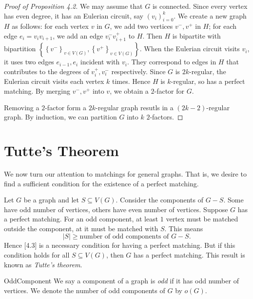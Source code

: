 \documentclass[co342]{subfiles}
\begin{document}
    \begin{proof}[Proof of Proposition 4.2]
        We may assume that $G$ is connected. Since every vertex has even degree, it has an Eulerian circuit, say $\left( v_{i} \right)^{k}_{i=0}$. We create a new graph $H$ as follows: for each vertex $v$ in $G$, we add two vertices $v^-, v^+$ in $H$; for each edge $e_i=v_iv_{i+1}$, we add an edge $v_i^-v_{i+1}^+$ to $H$. Then $H$ is bipartite with bipartition $\left\lbrace \left\lbrace v^- \right\rbrace^{}_{v\in V\left( G \right)}, \left\lbrace v^+ \right\rbrace^{}_{v\in V\left( G \right)} \right\rbrace$. When the Eulerian circuit visits $v_i$, it uses two edges $e_{i-1},e_i$ incident with $v_i$. They correspond to edges in $H$ that contributes to the degrees of $v_i^+, v_i^-$ respectively. Since $G$ is $2k$-regular, the Eulerian circuit visits each vertex $k$ times. Hence $H$ is $k$-regular, so has a perfect matching. By merging $v^-,v^+$ into $v$, we obtain a $2$-factor for $G$.

        Removing a $2$-factor form a $2k$-regular graph resutls in a $\left( 2k-2 \right)$-regular graph. By induction, we can partition $G$ into $k$ $2$-factors.
    \end{proof}

    \section{Tutte's Theorem}
    
    \np We now turn our attention to matchings for general graphs. That is, we desire to find a sufficient condition for the existence of a perfect matching. 

    Let $G$ be a graph and let $S\subseteq V\left( G \right)$. Consider the components of $G-S$. Some have odd number of vertices, others have even number of vertices. Suppose $G$ has a perfect matching. For an odd component, at least $1$ vertex must be matched outside the component, at it must be matched with $S$. This means
    \begin{equation}
        \left| S \right|\geq \text{number of odd components of $G-S$}.
    \end{equation}
    Hence [4.3] is a necessary condition for having a perfect matching. But if this condition holds for all $S\subseteq V\left( G \right)$, then $G$ has a perfect matching. This result is known as \textit{Tutte's theorem}.

    \begin{definition}{Odd}{Component}
        We say a component of a graph is \emph{odd} if it has odd number of vertices. We denote the number of odd components of $G$ by $o\left( G \right)$.
    \end{definition}
\end{document}
